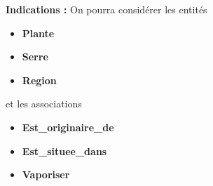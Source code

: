 \documentclass[a4paper,12pt,french]{article}
\begin{document}
\textbf{Indications :} On pourra considérer les entités
\begin{itemize}
\item \textbf{Plante}
\item \textbf{Serre}
\item \textbf{Region}
\end{itemize}
et les associations
\begin{itemize}
\item \textbf{Est\_originaire\_de}
\item  \textbf{Est\_situee\_dans}
\item   \textbf{Vaporiser}\textbf{}
\end{itemize}
\end{document}
